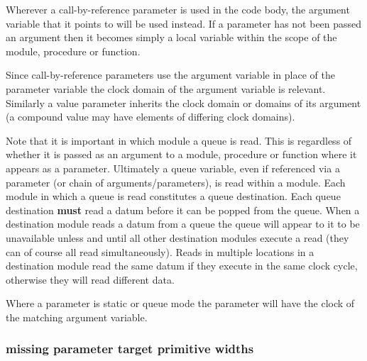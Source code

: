             Wherever a call-by-reference parameter is used in the code body,
            the argument variable that it points to will be used instead. If a
            parameter has not been passed an argument then it becomes simply
            a local variable within the scope of the module, procedure or
            function.
            
            Since call-by-reference parameters use the argument variable in
            place of the parameter variable the clock domain of the
            argument variable is relevant. Similarly a value parameter inherits
            the clock domain or domains of its argument (a compound
            value may have elements of differing clock domains).
            
            Note that it is important in which module a queue is read. This is
            regardless of whether it is passed as an argument to a module,
            procedure or function where it appears as a parameter. Ultimately a
            queue variable, even if referenced via a parameter (or chain of
            arguments/parameters), is read within a module.
            Each module in which a queue is read constitutes a queue destination.
            Each queue destination {\bf must} read a datum before it can be
            popped from the queue. When a destination module reads a datum from a
            queue the queue will appear to it to be unavailable unless and until
            all other destination modules execute a read (they can of course all
            read simultaneously). Reads in multiple locations in a destination
            module read the same datum if they execute in the same clock cycle,
            otherwise they will read different data.            

            Where a parameter is static or queue mode the parameter will
            have the clock of the matching argument variable.


            \subsubsection{missing parameter target primitive widths}
            

